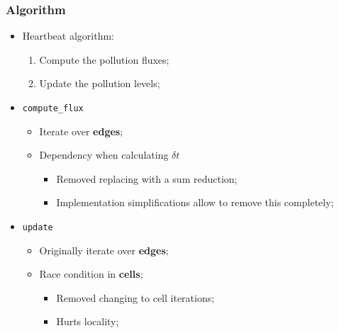\documentclass{beamer}
\begin{document}
\begin{frame}
	\frametitle{Algorithm}
	\begin{itemize}
		\item{Heartbeat algorithm:
		\begin{enumerate}
			\item{Compute the pollution fluxes;}
			\item{Update the pollution levels;}
		\end{enumerate}
		}
		\item{\texttt{compute\_flux}
		\begin{itemize}
			\item{Iterate over \textbf{edges};}
			\item{Dependency when calculating $\delta t$
			\begin{itemize}
				\item{Removed replacing with a sum reduction;}
				\item{Implementation simplifications allow to remove this completely;}
			\end{itemize}
			}
		\end{itemize}
		}
		\item{\texttt{update}
		\begin{itemize}
			\item{Originally iterate over \textbf{edges};}
			\item{Race condition in \textbf{cells};
			\begin{itemize}
				\item{Removed changing to cell iterations;}
				\item{Hurts locality;}
			\end{itemize}
			}
		\end{itemize}
		}
	\end{itemize}
\end{frame}
\end{document}
